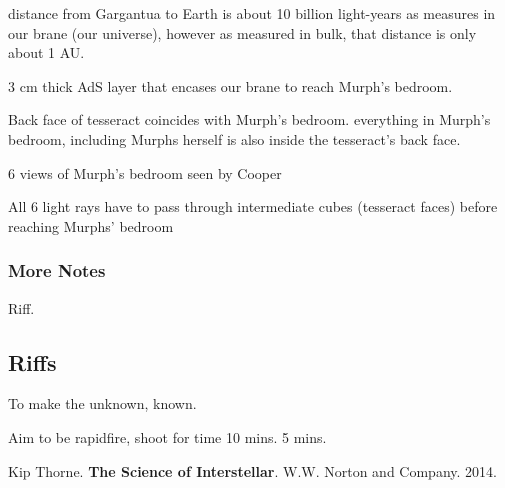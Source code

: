 \documentclass[10pt]{amsart}
\begin{document}
distance from Gargantua to Earth is about 10 billion light-years as measures in our brane (our universe), however as measured in bulk, that distance is only about 1 AU.

3 cm thick AdS layer that encases our brane to reach Murph's bedroom.

Back face of tesseract coincides with Murph's bedroom.
everything in Murph's bedroom, including Murphs herself is also inside the tesseract's back face.

6 views of Murph's bedroom seen by Cooper

All 6 light rays have to pass through intermediate cubes (tesseract faces) before reaching Murphs' bedroom




\subsubsection{More Notes}

Riff.


\subsection{Riffs}

To make the unknown, known.

Aim to be rapidfire, shoot for time 10 mins. 5 mins.

\begin{thebibliography}{9}

Kip Thorne. \textbf{The Science of Interstellar}. W.W. Norton and Company. 2014.

\end{thebibliography}
\end{document}
